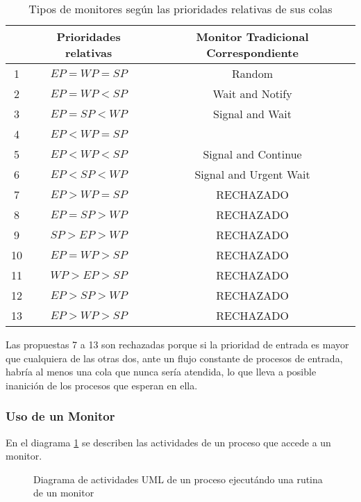 \begin{table}[H]
\centering
\begin{tabular}{|c|c|c|}
\hline
 & Prioridades relativas & Monitor Tradicional Correspondiente \\ \hline
1 & $EP = WP = SP$ & Random\\ \hline
2 & $EP = WP < SP$ & Wait and Notify\\ \hline
3 & $EP = SP < WP$ & Signal and Wait\\ \hline
4 & $EP < WP = SP$ & \\ \hline
5 & $EP < WP < SP$ & Signal and Continue\\ \hline
6 & $EP < SP < WP$ & Signal and Urgent Wait\\ \hline
7 & $EP > WP = SP$ & RECHAZADO\\ \hline
8 & $EP = SP > WP$ & RECHAZADO\\ \hline
9 & $SP > EP > WP$ & RECHAZADO\\ \hline
10 & $EP = WP > SP$ & RECHAZADO\\ \hline
11 & $WP > EP > SP$ & RECHAZADO\\ \hline
12 & $EP > SP > WP$ & RECHAZADO\\ \hline
13 & $EP > WP > SP$ & RECHAZADO\\ \hline
\end{tabular}
\caption{Tipos de monitores según las prioridades relativas de sus colas}
\label{tab:prioridades_monitores}
\end{table}

Las propuestas 7 a 13 son rechazadas porque si la prioridad de entrada es mayor
que cualquiera de las otras dos, ante un flujo constante de procesos de
entrada, habría al menos una cola que nunca sería atendida, lo que lleva a
posible inanición de los procesos que esperan en ella.

\subsubsection{Uso de un Monitor}
En el diagrama \ref{fig:actividad_proceso_monitor} se describen las actividades
de un proceso que accede a un monitor.

\begin{figure}[H]
  \centering
  \caption{Diagrama de actividades UML de un proceso ejecutándo una rutina de
  un monitor}
  \label{fig:actividad_proceso_monitor}
\end{figure}

